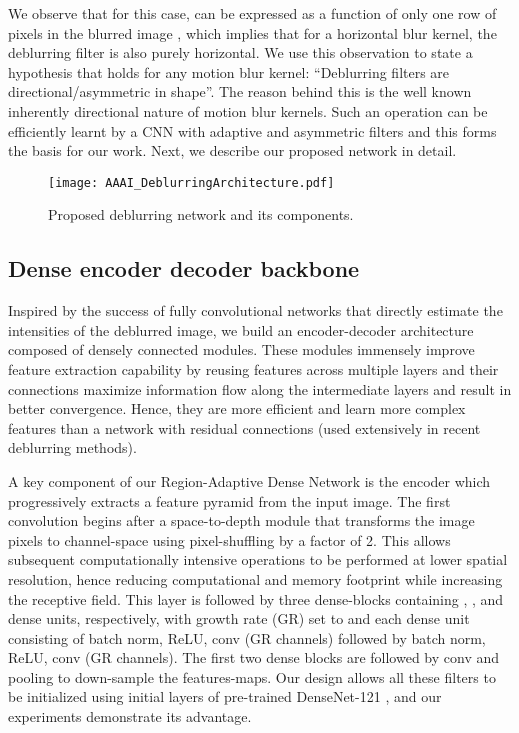 \documentclass[letterpaper]{article} \usepackage{aaai20}  \usepackage{times}  \usepackage{helvet} \usepackage{courier}  \usepackage[hyphens]{url}  \usepackage{graphicx} \urlstyle{rm} \def\UrlFont{\rm}  \usepackage{graphicx}  \frenchspacing  \setlength{\pdfpagewidth}{8.5in}  \setlength{\pdfpageheight}{11in}
\begin{document}
We observe that for this case,  can be expressed as a function of only one row of pixels in the blurred image , which implies that for a horizontal blur kernel, the deblurring filter is also purely horizontal. We use this observation to state a hypothesis that holds for any motion blur kernel: ``Deblurring filters are directional/asymmetric in shape''. The reason behind this is the well known inherently directional nature of motion blur kernels. Such an operation can be efficiently learnt by a CNN with adaptive and asymmetric filters and this forms the basis for our work. Next, we describe our proposed network in detail.



\begin{figure}[]
\centering
\texttt{[image: AAAI\_DeblurringArchitecture.pdf]}
\caption{Proposed deblurring network and its components.}
\label{fig:architecture}
\end{figure}

\subsection{Dense encoder decoder backbone}

Inspired by the success of fully convolutional networks that directly estimate the intensities of the deblurred image, we build an encoder-decoder architecture composed of densely connected modules. These modules immensely improve feature extraction capability by reusing features across multiple layers and their connections maximize information flow along the intermediate layers and result in better convergence. Hence, they are more efficient and learn more complex features than a network with residual connections (used extensively in recent deblurring methods).

A key component of our Region-Adaptive Dense Network is the encoder which progressively extracts a feature pyramid from the input image. The first convolution begins after a space-to-depth module that transforms the image pixels to channel-space using pixel-shuffling by a factor of 2. This allows subsequent computationally intensive operations to be performed at lower spatial resolution, hence reducing computational and memory footprint while increasing the receptive field. This layer is followed by three dense-blocks containing , , and  dense units, respectively, with growth rate (GR) set to  and each dense unit consisting of batch norm, ReLU,  conv (GR channels) followed by batch norm, ReLU,  conv (GR channels). The first two dense blocks are followed by  conv and pooling to down-sample the features-maps. Our design allows all these filters to be initialized using initial layers of pre-trained DenseNet-121 \cite{huang2017densely}, and our experiments demonstrate its advantage. 
\end{document}
